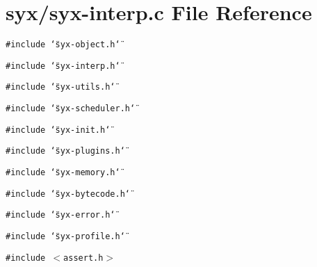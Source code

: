 \hypertarget{syx-interp_8c}{
\section{syx/syx-interp.c File Reference}
\label{syx-interp_8c}
}
{\tt \#include \char`\"{}syx-object.h\char`\"{}}\par
{\tt \#include \char`\"{}syx-interp.h\char`\"{}}\par
{\tt \#include \char`\"{}syx-utils.h\char`\"{}}\par
{\tt \#include \char`\"{}syx-scheduler.h\char`\"{}}\par
{\tt \#include \char`\"{}syx-init.h\char`\"{}}\par
{\tt \#include \char`\"{}syx-plugins.h\char`\"{}}\par
{\tt \#include \char`\"{}syx-memory.h\char`\"{}}\par
{\tt \#include \char`\"{}syx-bytecode.h\char`\"{}}\par
{\tt \#include \char`\"{}syx-error.h\char`\"{}}\par
{\tt \#include \char`\"{}syx-profile.h\char`\"{}}\par
{\tt \#include $<$assert.h$>$}\par
